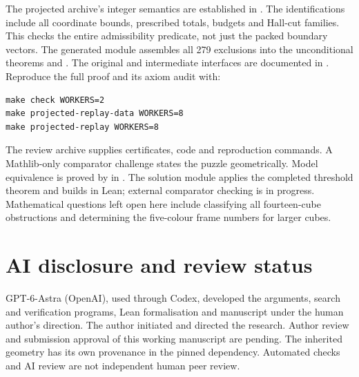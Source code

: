 \documentclass[11pt]{article}
\theoremstyle{remark}
\begin{document}
The projected archive's integer semantics are established in
. The identifications include all
coordinate bounds, prescribed totals, budgets and Hall-cut families.
This checks the entire admissibility predicate, not just the packed boundary
vectors. The generated module 
assembles all 279 exclusions into the unconditional theorems
 and
.
The original and intermediate interfaces are documented in
. Reproduce the full proof and its axiom audit with:
\begin{verbatim}
make check WORKERS=2
make projected-replay-data WORKERS=8
make projected-replay WORKERS=8
\end{verbatim}

The review archive supplies certificates, code and reproduction commands.
A Mathlib-only comparator challenge states the puzzle geometrically.
Model equivalence is proved by 
in . The solution module applies the
completed threshold theorem and builds in Lean; external comparator checking
is in progress.
Mathematical questions left
open here include classifying all fourteen-cube obstructions and determining
the five-colour frame numbers for larger cubes.

\section*{AI disclosure and review status}
GPT-6-Astra (OpenAI), used through Codex, developed the arguments, search and
verification programs, Lean formalisation and manuscript under the human
author's direction. The author initiated and directed the research. Author
review and submission approval of this working manuscript are pending.
The inherited geometry has its own provenance in the pinned dependency.
Automated checks and AI review are not independent human peer review.
\end{document}
